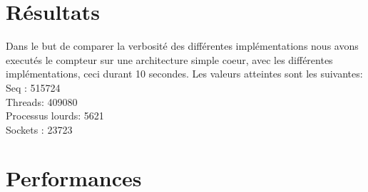\documentclass[a4paper]{article}
\begin{document}
 

\section{Résultats}

Dans le but de comparer la verbosité des différentes implémentations
nous avons executés le compteur sur une architecture simple coeur, avec
les différentes implémentations, ceci durant 10 secondes.
Les valeurs atteintes sont les suivantes: \\
Seq : 515724\\
Threads: 409080\\
Processus lourds: 5621\\
Sockets : 23723
 
\section{Performances}
\end{document}
